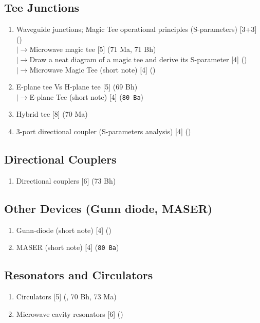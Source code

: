 \documentclass[12pt]{article}
\newcommand{\lb}{\\$\left|\rightarrow\right.$}
\begin{document}
  \subsection{Tee Junctions}
    \begin{enumerate}[topsep=0pt, noitemsep]
      \item Waveguide junctions; Magic Tee operational principles (S-parameters) \hfill [3+3] ()
        \lb Microwave magic tee \hfill [5] (71 Ma, 71 Bh)
        \lb Draw a neat diagram of a magic tee and derive its S-parameter \hfill [4] ()
        \lb Microwave Magic Tee (short note) \hfill [4] ()
      \item E-plane tee Vs H-plane tee \hfill [5] (69 Bh)
        \lb E-plane Tee (short note) \hfill [4] (\texttt{80 Ba})
      \item Hybrid tee \hfill [8] (70 Ma)
      \item 3-port directional coupler (S-parameters analysis) \hfill [4] ()
    \end{enumerate}

  \subsection{Directional Couplers}
    \begin{enumerate}[topsep=0pt, noitemsep]
      \item Directional couplers \hfill [6] (73 Bh)
    \end{enumerate}

  \subsection{Other Devices (Gunn diode, MASER)}
    \begin{enumerate}[topsep=0pt, noitemsep]
      \item Gunn-diode (short note) \hfill [4] ()
      \item MASER (short note) \hfill [4] (\texttt{80 Ba})
    \end{enumerate}

  \subsection{Resonators and Circulators}
    \begin{enumerate}[topsep=0pt, noitemsep]
      \item Circulators \hfill [5] (, 70 Bh, 73 Ma)
      \item Microwave cavity resonators \hfill [6] ()
    \end{enumerate}
\end{document}
